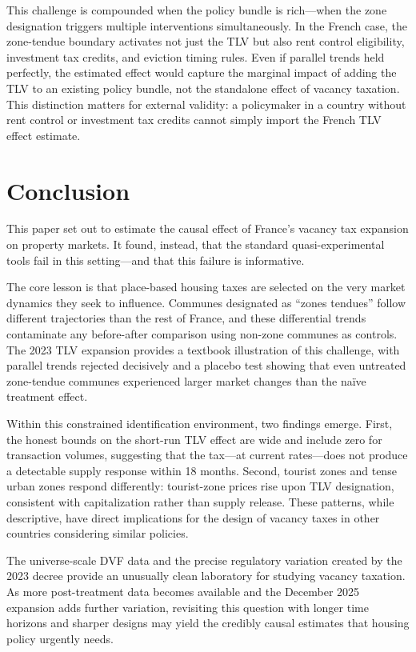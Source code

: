 \documentclass[12pt]{article}
\begin{document}
This challenge is compounded when the policy bundle is rich---when the zone designation triggers multiple interventions simultaneously. In the French case, the zone-tendue boundary activates not just the TLV but also rent control eligibility, investment tax credits, and eviction timing rules. Even if parallel trends held perfectly, the estimated effect would capture the marginal impact of adding the TLV to an existing policy bundle, not the standalone effect of vacancy taxation. This distinction matters for external validity: a policymaker in a country without rent control or investment tax credits cannot simply import the French TLV effect estimate.

\section{Conclusion}\label{sec:conclusion}

This paper set out to estimate the causal effect of France's vacancy tax expansion on property markets. It found, instead, that the standard quasi-experimental tools fail in this setting---and that this failure is informative.

The core lesson is that place-based housing taxes are selected on the very market dynamics they seek to influence. Communes designated as ``zones tendues'' follow different trajectories than the rest of France, and these differential trends contaminate any before-after comparison using non-zone communes as controls. The 2023 TLV expansion provides a textbook illustration of this challenge, with parallel trends rejected decisively and a placebo test showing that even untreated zone-tendue communes experienced larger market changes than the na\"ive treatment effect.

Within this constrained identification environment, two findings emerge. First, the honest bounds on the short-run TLV effect are wide and include zero for transaction volumes, suggesting that the tax---at current rates---does not produce a detectable supply response within 18 months. Second, tourist zones and tense urban zones respond differently: tourist-zone prices rise upon TLV designation, consistent with capitalization rather than supply release. These patterns, while descriptive, have direct implications for the design of vacancy taxes in other countries considering similar policies.

The universe-scale DVF data and the precise regulatory variation created by the 2023 decree provide an unusually clean laboratory for studying vacancy taxation. As more post-treatment data becomes available and the December 2025 expansion adds further variation, revisiting this question with longer time horizons and sharper designs may yield the credibly causal estimates that housing policy urgently needs.
\end{document}
